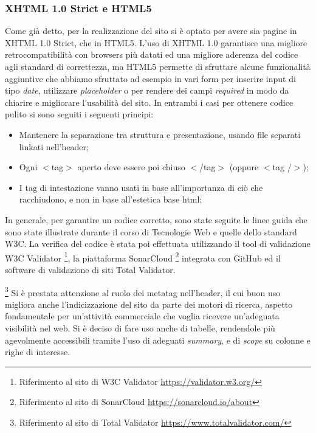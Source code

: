 \documentclass{article}
\begin{document}
			\subsubsection{XHTML 1.0 Strict e HTML5}
			    Come già detto, per la realizzazione del sito si è optato per avere sia pagine in XHTML 1.0 Strict, che in HTML5. L'uso di XHTML 1.0 garantisce una migliore retrocompatibilità con browsers più datati ed una migliore aderenza del codice agli standard di correttezza, ma HTML5 permette di sfruttare alcune funzionalità aggiuntive che abbiamo sfruttato ad esempio in vari form per inserire input di tipo \textit{date}, utilizzare \textit{placeholder} o per rendere dei campi \textit{required} in modo da chiarire e migliorare l'usabilità del sito. In entrambi i casi per ottenere codice pulito si sono seguiti i seguenti principi:
			    \begin{itemize}
			        \item Mantenere la separazione tra struttura e presentazione, usando file separati linkati nell'header;
			        \item Ogni $<$tag$>$ aperto deve essere poi chiuso $<$/tag$>$ (oppure $<$tag /$>$);
			        \item I tag di intestazione vanno usati in base all'importanza di ciò che racchiudono, e non in base all'estetica base html;
			    \end{itemize}
			    
			     In generale, per garantire un codice corretto, sono state seguite le linee guida che sono state illustrate durante il corso di Tecnologie Web e quelle dello standard W3C. La verifica del codice è stata poi effettuata  utilizzando il tool di validazione W3C Validator%
			    \footnote{Riferimento al sito di W3C Validator \url{https://validator.w3.org/}},
			    la piattaforma SonarCloud 
			    \footnote{Riferimento al sito di SonarCloud \url{https://sonarcloud.io/about}}
			    integrata con GitHub
			    ed il software di validazione di siti Total Validator.%

			    \footnote{Riferimento al sito di Total Validator \url{https://www.totalvalidator.com/}}
			    \newline Si è prestata attenzione al ruolo dei metatag nell'header, il cui buon uso migliora anche l'indicizzazione del sito da parte dei motori di ricerca, aspetto fondamentale per un'attività commerciale che voglia ricevere un'adeguata visibilità nel web.
			    \newline Si è deciso di fare uso anche di tabelle, rendendole più agevolmente accessibili tramite l'uso di adeguati \textit{summary}, e di \textit{scope} su colonne e righe di interesse.
			
\end{document}
